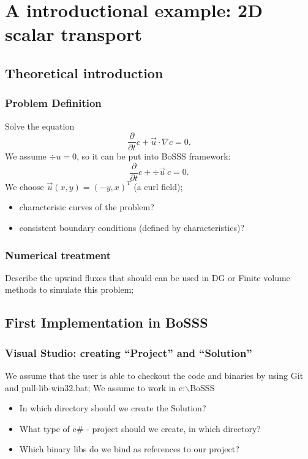 \section{A introductional example: 2D scalar transport}

\subsection{Theoretical introduction}

\subsubsection{Problem Definition}

Solve the equation
\[
    \frac{\partial}{\partial t } c + \vec{u} \cdot \nabla c = 0.
\]
We assume $\div{u} = 0$, so it can be put into BoSSS framework:
\[
    \frac{\partial}{\partial t } c + \div{ \vec{u} \ c } = 0.
\]
We choose $\vec{u}(x,y) = (-y,x)^T$ (a curl field);
\begin{itemize}
  \item characterisic curves of the problem?
  \item consistent boundary conditions (defined by characteristics)?
\end{itemize}

\subsubsection{Numerical treatment}

Describe the upwind fluxes that should can be used in DG or Finite volume methods to 
simulate this problem;

\subsection{First Implementation in BoSSS}



\subsubsection{Visual Studio: creating ``Project'' and ``Solution''}

We assume that the user is able to checkout the code and binaries
by using Git and pull-lib-win32.bat;
We assume to work in c:$\backslash$BoSSS

\begin{itemize}
 \item In which directory should we create the Solution? 
 \item What type of c\# - project should we create, in which directory?
 \item Which binary libs do we bind as references to our project?
\end{itemize}

